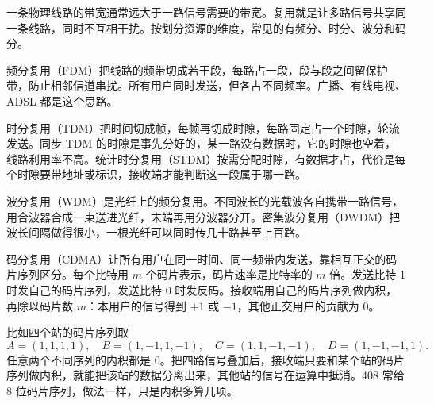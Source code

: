一条物理线路的带宽通常远大于一路信号需要的带宽。复用就是让多路信号共享同一条线路，同时不互相干扰。按划分资源的维度，常见的有频分、时分、波分和码分。

频分复用（FDM）把线路的频带切成若干段，每路占一段，段与段之间留保护带，防止相邻信道串扰。所有用户同时发送，但各占不同频率。广播、有线电视、ADSL 都是这个思路。

时分复用（TDM）把时间切成帧，每帧再切成时隙，每路固定占一个时隙，轮流发送。同步 TDM 的时隙是事先分好的，某一路没有数据时，它的时隙也空着，线路利用率不高。统计时分复用（STDM）按需分配时隙，有数据才占，代价是每个时隙要带地址或标识，接收端才能判断这一段属于哪一路。

波分复用（WDM）是光纤上的频分复用。不同波长的光载波各自携带一路信号，用合波器合成一束送进光纤，末端再用分波器分开。密集波分复用（DWDM）把波长间隔做得很小，一根光纤可以同时传几十路甚至上百路。

码分复用（CDMA）让所有用户在同一时间、同一频带内发送，靠相互正交的码片序列区分。每个比特用 $m$ 个码片表示，码片速率是比特率的 $m$ 倍。发送比特 1 时发自己的码片序列，发送比特 0 时发反码。接收端用自己的码片序列做内积，再除以码片数 $m$：本用户的信号得到 $+1$ 或 $-1$，其他正交用户的贡献为 0。

比如四个站的码片序列取
\[
A=(1,1,1,1),\quad B=(1,-1,1,-1),\quad
C=(1,1,-1,-1),\quad D=(1,-1,-1,1).
\]
任意两个不同序列的内积都是 0。把四路信号叠加后，接收端只要和某个站的码片序列做内积，就能把该站的数据分离出来，其他站的信号在运算中抵消。408 常给 8 位码片序列，做法一样，只是内积多算几项。

